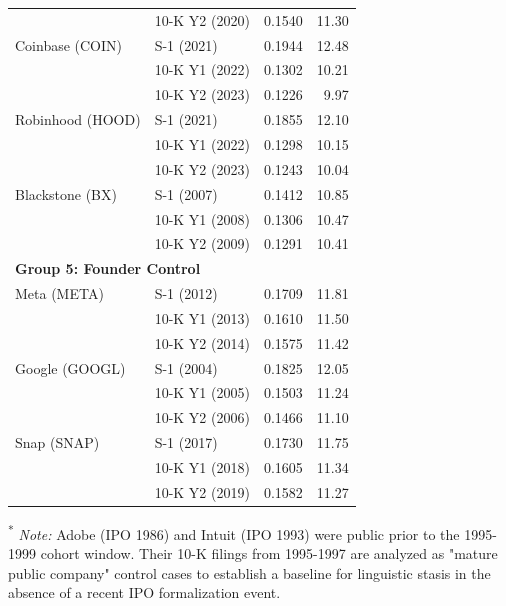 \documentclass[12pt, letterpaper]{article}
\begin{document}
\begin{table}
\begin{tabular}{@{}llrr@{}}
                            & 10-K Y2 (2020)               & 0.1540 & 11.30 \\
        \addlinespace
        Coinbase (COIN)     & S-1 (2021)                   & 0.1944 & 12.48 \\
                            & 10-K Y1 (2022)               & 0.1302 & 10.21 \\
                            & 10-K Y2 (2023)               & 0.1226 & 9.97 \\
        \addlinespace
        Robinhood (HOOD)    & S-1 (2021)                   & 0.1855 & 12.10 \\
                            & 10-K Y1 (2022)               & 0.1298 & 10.15 \\
                            & 10-K Y2 (2023)               & 0.1243 & 10.04 \\
        \addlinespace
        Blackstone (BX)     & S-1 (2007)                   & 0.1412 & 10.85 \\
                            & 10-K Y1 (2008)               & 0.1306 & 10.47 \\
                            & 10-K Y2 (2009)               & 0.1291 & 10.41 \\
        \midrule
        \multicolumn{4}{l}{\textbf{Group 5: Founder Control}} \\
        \addlinespace
        Meta (META)         & S-1 (2012)                   & 0.1709 & 11.81 \\
                            & 10-K Y1 (2013)               & 0.1610 & 11.50 \\
                            & 10-K Y2 (2014)               & 0.1575 & 11.42 \\
        \addlinespace
        Google (GOOGL)      & S-1 (2004)                   & 0.1825 & 12.05 \\
                            & 10-K Y1 (2005)               & 0.1503 & 11.24 \\
                            & 10-K Y2 (2006)               & 0.1466 & 11.10 \\
        \addlinespace
        Snap (SNAP)         & S-1 (2017)                   & 0.1730 & 11.75 \\
                            & 10-K Y1 (2018)               & 0.1605 & 11.34 \\
                            & 10-K Y2 (2019)               & 0.1582 & 11.27 \\
        \bottomrule
    \end{tabular}
    \par
    \textsuperscript{*} \small \textit{Note:} Adobe (IPO 1986) \cite{key21} and Intuit (IPO 1993) \cite{key22} were public prior to the 1995-1999 cohort window. Their 10-K filings from 1995-1997 are analyzed as "mature public company" control cases to establish a baseline for linguistic stasis in the absence of a recent IPO formalization event.
\end{table}
\end{document}
